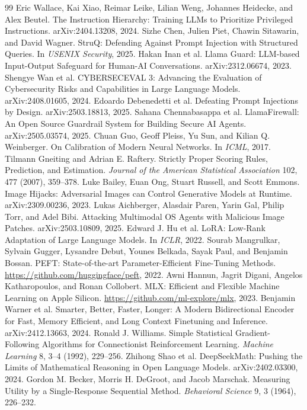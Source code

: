 \documentclass[sigconf,nonacm]{acmart}
\begin{document}
\begin{thebibliography}{99}
 Eric Wallace, Kai Xiao, Reimar Leike, Lilian Weng, Johannes Heidecke, and Alex Beutel. The Instruction Hierarchy: Training LLMs to Prioritize Privileged Instructions. arXiv:2404.13208, 2024.
 Sizhe Chen, Julien Piet, Chawin Sitawarin, and David Wagner. StruQ: Defending Against Prompt Injection with Structured Queries. In \emph{USENIX Security}, 2025.
 Hakan Inan et al. Llama Guard: LLM-based Input-Output Safeguard for Human-AI Conversations. arXiv:2312.06674, 2023.
 Shengye Wan et al. CYBERSECEVAL 3: Advancing the Evaluation of Cybersecurity Risks and Capabilities in Large Language Models. arXiv:2408.01605, 2024.
 Edoardo Debenedetti et al. Defeating Prompt Injections by Design. arXiv:2503.18813, 2025.
 Sahana Chennabasappa et al. LlamaFirewall: An Open Source Guardrail System for Building Secure AI Agents. arXiv:2505.03574, 2025.
 Chuan Guo, Geoff Pleiss, Yu Sun, and Kilian Q. Weinberger. On Calibration of Modern Neural Networks. In \emph{ICML}, 2017.
 Tilmann Gneiting and Adrian E. Raftery. Strictly Proper Scoring Rules, Prediction, and Estimation. \emph{Journal of the American Statistical Association} 102, 477 (2007), 359--378.
 Luke Bailey, Euan Ong, Stuart Russell, and Scott Emmons. Image Hijacks: Adversarial Images can Control Generative Models at Runtime. arXiv:2309.00236, 2023.
 Lukas Aichberger, Alasdair Paren, Yarin Gal, Philip Torr, and Adel Bibi. Attacking Multimodal OS Agents with Malicious Image Patches. arXiv:2503.10809, 2025.
 Edward J. Hu et al. LoRA: Low-Rank Adaptation of Large Language Models. In \emph{ICLR}, 2022.
 Sourab Mangrulkar, Sylvain Gugger, Lysandre Debut, Younes Belkada, Sayak Paul, and Benjamin Bossan. PEFT: State-of-the-art Parameter-Efficient Fine-Tuning Methods. \url{https://github.com/huggingface/peft}, 2022.
 Awni Hannun, Jagrit Digani, Angelos Katharopoulos, and Ronan Collobert. MLX: Efficient and Flexible Machine Learning on Apple Silicon. \url{https://github.com/ml-explore/mlx}, 2023.
 Benjamin Warner et al. Smarter, Better, Faster, Longer: A Modern Bidirectional Encoder for Fast, Memory Efficient, and Long Context Finetuning and Inference. arXiv:2412.13663, 2024.
 Ronald J. Williams. Simple Statistical Gradient-Following Algorithms for Connectionist Reinforcement Learning. \emph{Machine Learning} 8, 3--4 (1992), 229--256.
 Zhihong Shao et al. DeepSeekMath: Pushing the Limits of Mathematical Reasoning in Open Language Models. arXiv:2402.03300, 2024.
 Gordon M. Becker, Morris H. DeGroot, and Jacob Marschak. Measuring Utility by a Single-Response Sequential Method. \emph{Behavioral Science} 9, 3 (1964), 226--232.
\end{thebibliography}
\end{document}

